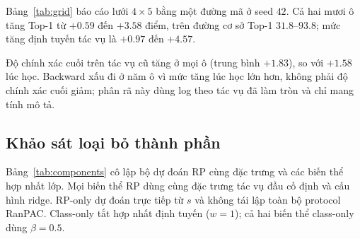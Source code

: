 \documentclass[runningheads]{llncs}
\begin{document}
Bảng~\ref{tab:grid} báo cáo lưới $4\times5$ bằng một đường mã ở seed $42$.
Cả hai mươi ô tăng Top-1 từ $+0.59$ đến $+3.58$ điểm, trên đường cơ sở Top-1
$31.8$--$93.8$; mức tăng định tuyến tác vụ là $+0.97$ đến $+4.57$.

Độ chính xác cuối trên tác vụ cũ tăng ở mọi ô (trung bình $+1.83$), so với
$+1.58$ lúc học. Backward xấu đi ở năm ô vì mức tăng lúc học lớn hơn, không
phải độ chính xác cuối giảm; phân rã này dùng log theo tác vụ đã làm tròn và
chỉ mang tính mô tả.

\subsection{Khảo sát loại bỏ thành phần}
\label{sec:ablation}

\noindent\begin{minipage}{\linewidth}
Bảng~\ref{tab:components} cô lập bộ dự đoán RP cùng đặc trưng và các biến thể
hợp nhất lớp. Mọi biến thể RP dùng cùng đặc trưng tác vụ đầu cố định và cấu
hình ridge. RP-only dự đoán trực tiếp từ $s$ và không tái lập toàn bộ protocol
RanPAC. Class-only tắt hợp nhất định tuyến ($w=1$); cả hai biến thể class-only
dùng $\beta=0.5$.
\end{minipage}
\par\medskip
\end{document}
